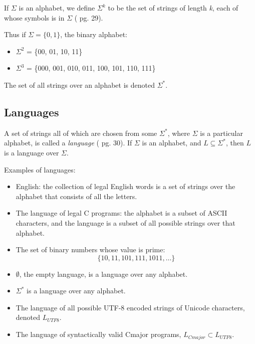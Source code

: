 \documentclass[a4paper,oneside,11pt]{book}
\theoremstyle{definition}
\begin{document}
If $\Sigma$ is an alphabet, we define $\Sigma^k$ to be the set of strings of length \emph{k}, each of whose
symbols is in $\Sigma$ (\cite{AUTOMATA} pg. 29).

Thus if $\Sigma = \{0, 1\}$, the binary alphabet:
\begin{itemize}
\item
$\Sigma^2$ = \{00, 01, 10, 11\}

\item
$\Sigma^3$ = \{000, 001, 010, 011, 100, 101, 110, 111\}
\end{itemize}

The set of all strings over an alphabet is denoted $\Sigma^*$.

\subsection{Languages}

A set of strings all of which are chosen from some $\Sigma^*$, where $\Sigma$ is a particular alphabet,
is called a \emph{language} (\cite{AUTOMATA} pg. 30).
If $\Sigma$ is an alphabet, and $L \subseteq \Sigma^*$, then $L$ is a language over $\Sigma$.

Examples of languages:
\begin{itemize}
\item
English: the collection of legal English words is a set of strings over the alphabet that consists of all
the letters.

\item
The language of legal C programs:
the alphabet is a subset of ASCII characters, and the language is a subset of all possible strings over
that alphabet.

\item
The set of binary numbers whose value is prime:
$$\{10, 11, 101, 111, 1011, \ldots\}$$

\item
$\emptyset$, the empty language, is a language over any alphabet.

\item
$\Sigma^*$ is a language over any alphabet.

\item
The language of all possible UTF-8 encoded strings of Unicode characters, denoted $L_{UTF8}$.

\item
The language of syntactically valid Cmajor programs, $L_{Cmajor} \subset L_{UTF8}$.
\end{itemize}
\end{document}
